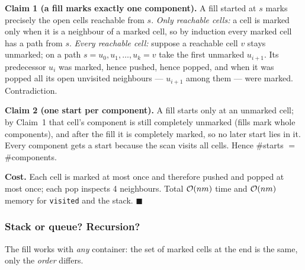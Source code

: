 \begin{invariantbox}
\textbf{Claim 1 (a fill marks exactly one component).} A fill started at $s$ marks precisely the open cells reachable from $s$.
\emph{Only reachable cells:} a cell is marked only when it is a neighbour of a marked cell, so by induction every marked cell has a path from $s$.
\emph{Every reachable cell:} suppose a reachable cell $v$ stays unmarked; on a path $s = u_0, u_1, \dots, u_k = v$ take the first unmarked $u_{i+1}$. Its predecessor $u_i$ was marked, hence pushed, hence popped, and when it was popped all its open unvisited neighbours --- $u_{i+1}$ among them --- were marked. Contradiction.

\textbf{Claim 2 (one start per component).} A fill starts only at an unmarked cell; by Claim~1 that cell's component is still completely unmarked (fills mark whole components), and after the fill it is completely marked, so no later start lies in it. Every component gets a start because the scan visits all cells. Hence \#starts $=$ \#components.

\textbf{Cost.} Each cell is marked at most once and therefore pushed and popped at most once; each pop inspects 4 neighbours. Total $\mathcal{O}(nm)$ time and $\mathcal{O}(nm)$ memory for \texttt{visited} and the stack. \hfill$\blacksquare$
\end{invariantbox}

\subsubsection*{Stack or queue? Recursion?}

The fill works with \emph{any} container: the set of marked cells at the end is the same, only the \emph{order} differs.

